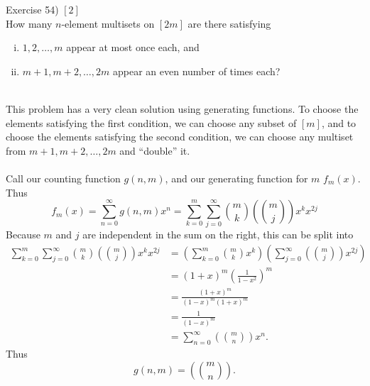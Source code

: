 \documentclass{article}
\newenvironment{problem}[2][Problem]{\begin{trivlist}
\item[\hskip \labelsep {\bfseries #1}\hskip \labelsep {\bfseries #2.}]}{\end{trivlist}}
\newenvironment{solution}[1][Solution.]{\begin{trivlist}
\item[\hskip \labelsep {\bfseries #1}]}{\end{trivlist}}
\begin{document}
\pagebreak
\begin{problem}{4} (Exercise 54) $[2]$ \\
  How many $n$-element multisets on $[2m]$ are there satisfying
  \begin{enumerate}[(i)]
    \item $1, 2, \hdots, m$ appear at most once each, and
    \item $m+1, m+2, \hdots, 2m$ appear an even number of times each?
  \end{enumerate}
\end{problem}

\begin{solution} \text{} \\
  This problem has a very clean solution using generating functions. To choose
  the elements
  satisfying the first condition, we can choose any subset of $[m]$, and to
  choose the elements satisfying the second condition, we can choose any
  multiset from ${m+1, m+2, \hdots, 2m}$ and ``double'' it.
  \\~\\
  Call our counting function $g(n, m)$, and our generating function for $m$
  $f_m(x)$.
  Thus \[
    f_m(x)
    = \sum_{n=0}^\infty g(n, m)x^n
    = \sum_{k=0}^m\sum_{j=0}^\infty \binom{m}{k}\left(\!\!\binom{m}{j}\!\!\right)x^kx^{2j}
  \]
  Because $m$ and $j$ are independent in the sum on the right, this can be split
  into \begin{align*}
    \sum_{k=0}^m\sum_{j=0}^\infty \binom{m}{k}\left(\!\!\binom{m}{j}\!\!\right)x^kx^{2j}
    &= \left(\sum_{k=0}^m\binom{m}{k}x^k\right)
       \left(\sum_{j=0}^\infty\left(\!\!\binom{m}{j}\!\!\right)x^{2j}\right) \\
    &= (1 + x)^m\left(\frac{1}{1 - x^2}\right)^m \\
    &= \frac{(1 + x)^m}{(1 - x)^m(1 + x)^m} \\
    &= \frac{1}{(1 - x)^m} \\
    &= \sum_{n=0}^\infty \left(\!\!\binom{m}{n}\!\!\right)x^n.
  \end{align*}
  Thus \[
    g(n, m) = \left(\!\!\binom{m}{n}\!\!\right).
  \]
\end{solution}
\end{document}
